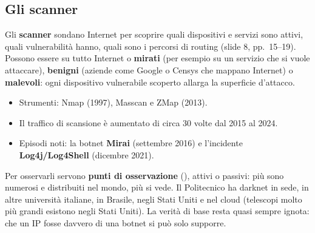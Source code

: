 \subsection{Gli scanner}
Gli \textbf{scanner} sondano Internet per scoprire quali dispositivi e servizi sono attivi, quali vulnerabilità hanno, quali sono i
percorsi di routing (slide 8, pp.~15--19). Possono essere su tutto Internet o \textbf{mirati} (per esempio su un servizio che si vuole
attaccare), \textbf{benigni} (aziende come Google o Censys che mappano Internet) o \textbf{malevoli}: ogni dispositivo vulnerabile
scoperto allarga la superficie d'attacco.
\begin{itemize}
  \item Strumenti: Nmap (1997), Masscan e ZMap (2013).
  \item Il traffico di scansione è aumentato di circa 30 volte dal 2015 al 2024.
  \item Episodi noti: la botnet \textbf{Mirai} (settembre 2016) e l'incidente \textbf{Log4j/Log4Shell} (dicembre 2021).
\end{itemize}
Per osservarli servono \textbf{punti di osservazione} (), attivi o passivi: più sono numerosi e distribuiti nel mondo,
più si vede. Il Politecnico ha darknet in sede, in altre università italiane, in Brasile, negli Stati Uniti e nel cloud (telescopi
molto più grandi esistono negli Stati Uniti). La verità di base resta quasi sempre ignota: che un IP fosse davvero di una botnet si può
solo supporre.

